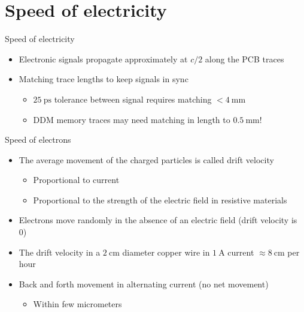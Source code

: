 \documentclass{beamer}
\begin{document}
\section{Speed of electricity}

\begin{frame}{Speed of electricity}
\begin{itemize}
 \item Electronic signals propagate approximately at $c/2$ along the PCB traces~\cite[p. 8--9]{horowitz2020art}
 \item Matching trace lengths to keep signals in sync
 \begin{itemize}
  \item $\SI{25}{\pico\second}$ tolerance between signal requires matching $<\SI{4}{\milli\meter}$
  \item DDM memory traces may need matching in length to $\SI{0.5}{\milli\meter}$!\\
 \end{itemize}
\end{itemize}
\end{frame}

\begin{frame}{Speed of electrons}
\begin{itemize}
 \item The average movement of the charged particles is called drift velocity
 \begin{itemize}
  \item Proportional to current
  \item Proportional to the strength of the electric field in resistive materials
 \end{itemize}
 \item Electrons move randomly in the absence of an electric field (drift velocity is 0)
 \item The drift velocity in a $\SI{2}{\centi\meter}$ diameter copper wire in
       $\SI{1}{\ampere}$ current $\approx\SI{8}{\centi\meter}$ per hour~\cite{wiki:Speed_of_electricity}
 \item Back and forth movement in alternating current (no net movement)
 \begin{itemize}
  \item Within few micrometers
 \end{itemize}
\end{itemize}

\end{frame}
\end{document}
